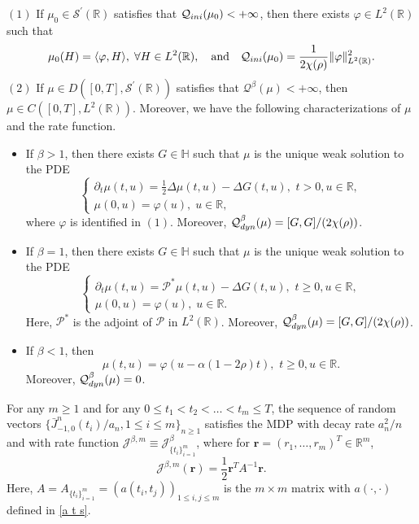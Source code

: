 \documentclass[10pt,a4paper]{amsart}
\newcommand{\R}{\mathbb{R}}
\newcommand{\Scal}{\mathcal{S}}
\begin{document}
\begin{lemma}\label{lemma finite rate} 
$(1)$ If $\mu_0 \in \Scal^\prime(\R)$ satisfies that $\mathcal{Q}_{\rm ini}(\mu_0)<+\infty$, then there exists $\varphi \in L^2(\R)$ such that
\[
\mu_0 (H) = \langle \varphi, H\rangle, \; \forall H \in L^2 (\R), \quad \text{and} \quad \mathcal{Q}_{\rm ini}(\mu_0)=\frac{1}{2\chi(\rho)} \|\varphi\|_{L^2 (\R)}^2.
\]
$(2)$ If $\mu\in D ([0, T], \Scal^\prime(\R))$ satisfies that $\mathcal{Q}^\beta(\mu)<+\infty$, then $\mu\in C([0, T], L^2(\R))$. Moreover, we have the following characterizations of  $\mu$ and the rate function.

\begin{itemize}
	\item If  $\beta>1$, then there exists $G\in \mathbb{H}$ such that $\mu$ is the unique weak solution to the PDE
	\[\begin{cases}
	\partial_t \mu(t,u)=\frac{1}{2}\Delta\mu(t,u)-\Delta G(t,u), \text{~}t> 0, u\in \mathbb{R},\\
	\mu(0,u) = \varphi (u), \; u \in \R,
	\end{cases}\]
where $\varphi$ is identified in $(1)$. Moreover, $\mathcal{Q}^\beta_{\rm dyn}(\mu)=[G,G] / (2 \chi(\rho))$.
\item If  $\beta=1$, then there exists $G\in \mathbb{H}$ such that $\mu$ is the unique weak solution to the PDE
\[\begin{cases}
	\partial_t \mu(t,u)=\mathcal{P}^* \mu(t,u)-\Delta G(t,u), \text{~}t\geq 0, u\in \mathbb{R},\\
	\mu(0,u) = \varphi (u), \; u \in \R.
\end{cases}\]
Here, $\mathcal{P}^*$ is the adjoint of $\mathcal{P}$ in $L^2 (\R)$. Moreover, $\mathcal{Q}^\beta_{\rm dyn}(\mu)=[G,G] / (2 \chi(\rho))$.
\item If  $\beta< 1$, then 
\[
\mu(t,u)=\varphi( u-\alpha(1-2\rho)t), \text{~}t\geq 0, u\in \mathbb{R}.
\]
Moreover, $\mathcal{Q}^\beta_{\rm dyn}(\mu)=0$.
\end{itemize}
\end{lemma}

\begin{lemma}\label{lem: finiteD mdp current}
For any $m \geq 1$ and for any $0 \leq t_1 < t_2 < \ldots < t_m \leq T$, the sequence of random vectors $\{\bar{J}^n_{-1,0} (t_i)/a_n, 1 \leq i \leq m\}_{n \geq 1}$ satisfies the MDP with decay rate $a_n^2 / n$ and with rate function $\mathcal{J}^{\beta,m} \equiv \mathcal{J}^\beta_{\{t_i\}_{i=1}^m}$, where  for $\mathbf{r} =(r_1,\ldots, r_m)^T\in \mathbb{R}^m$,
\[\mathcal{J}^{\beta,m}  (\mathbf{r}) = \frac{1}{2} \mathbf{r}^T A^{-1} \mathbf{r}.\]
Here, $A = A_{\{t_i\}_{i=1}^m} = (a(t_i,t_j))_{1 \leq i,j \leq m}$ is the $m \times m$ matrix with $a(\cdot,\cdot)$ defined in \eqref{a t s}. 
\end{lemma}
\end{document}
